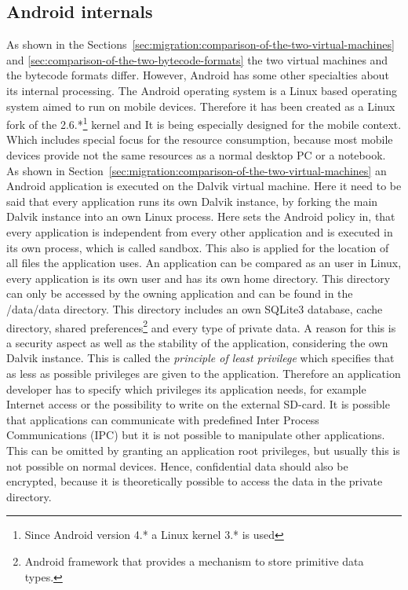 \subsection{Android internals}
\label{sec:android-internals}
As shown in the Sections~\ref{sec:migration:comparison-of-the-two-virtual-machines} and \ref{sec:comparison-of-the-two-bytecode-formats} the two virtual machines and the bytecode formats differ.
However, Android has some other specialties about its internal processing.
The Android operating system is a Linux based operating system aimed to run on mobile devices.
Therefore it has been created as a Linux fork of the 2.6.*\footnote{Since Android version 4.* a Linux kernel 3.* is used} kernel and 
It is being especially designed for the mobile context.
Which includes special focus for the resource consumption, because most mobile devices provide not the same resources as a normal desktop PC or a notebook.
As shown in Section~\ref{sec:migration:comparison-of-the-two-virtual-machines} an Android application is executed on the Dalvik virtual machine.
Here it need to be said that every application runs its own Dalvik instance, by forking the main Dalvik instance into an own Linux process.
Here sets the Android policy in, that every application is independent from every other application and is executed in its own process, which is called sandbox.
This also is applied for the location of all files the application uses.
An application can be compared as an user in Linux, every application is its own user and has its own home directory.
This directory can only be accessed by the owning application and can be found in the /data/data directory.
This directory includes an own SQLite3 database, cache directory, shared preferences\footnote{Android framework that provides a mechanism to store primitive data types.} and every type of private data.
A reason for this is a security aspect as well as the stability of the application, considering the own Dalvik instance.
This is called the \textit{principle of least privilege} which specifies that as less as possible privileges are given to the application.
Therefore an application developer has to specify which privileges its application needs, for example Internet access or the possibility to write on the external SD-card.
It is possible that applications can communicate with predefined Inter Process Communications (IPC) but it is not possible to manipulate other applications.
This can be omitted by granting an application root privileges, but usually this is not possible on normal devices.
Hence, confidential data should also be encrypted, because it is theoretically possible to access the data in the private directory.
